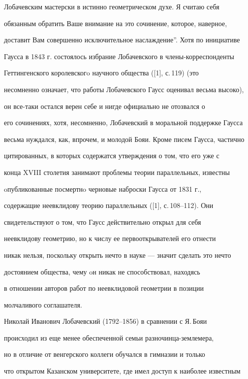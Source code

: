 Лобачевским мастерски в истинно геометрическом духе. Я считаю себя 


обязанным обратить Ваше внимание на это сочинение, которое, наверное, 


доставит Вам совершенно исключительное наслаждение''. Хотя по инициативе 


Гаусса в 1843 г. состоялось избрание Лобачевского в члены-корреспонденты 


Геттингенского королевскогo научного общества ([1], с.\,119) (это 


несомненно означает, что работы Лобачевского Гаусс оценивал весьма высоко), 


он все-таки остался верен себе и нигде официально не отозвался о 


его сочинениях, хотя, несомненно, Лобачевский в моральной поддержке Гаусса 


весьма нуждался, как, впрочем, и молодой Бояи. Кроме писем Гаусса, частично 


цитированных, в которых содержатся утверждения о том, что его уже с 


конца XVIII столетия занимают проблемы теории параллельных, известны 


oпубликованные посмертнo черновые наброски Гаусса от 1831 г., 


содержащие неевклидову теорию параллельных ([1], с.\,108--112). Они 


свидетельствуют о том, что Гаусс действительно открыл для себя 


неевклидову геометрию, но к числу ее первооткрывателей его отнести 


никак нельзя, поскольку открыть нечто в науке --- значит сделать это нечто


достоянием общества, чему oн никак не способствовал, находясь 


в отношении авторов работ по неевклидовой геометрии в позиции 


молчаливого соглашателя.





Николай Иванович Лобачевский (1792--1856) в сравнении с Я.\,Бояи 


происходил из еще менее обеспеченной семьи разночинца-землемера, 


но в отличие от венгерского коллеги обучался в гимназии и только 


что открытом Казанском университете, где имел доступ к наиболее известным 


